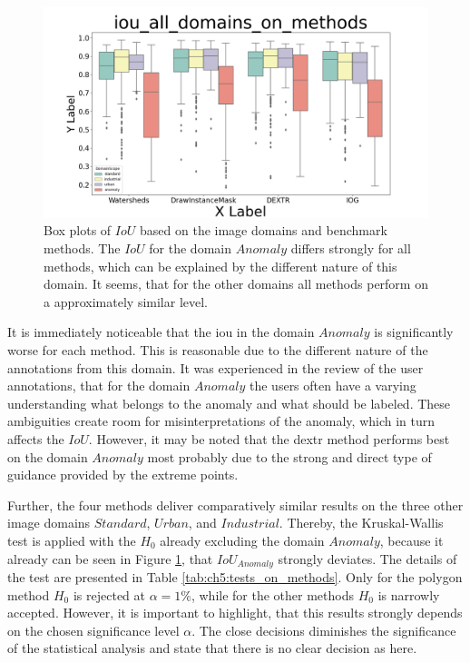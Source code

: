 \begin{figure}[h!]
	\centering
	\includegraphics[width=\textwidth]{figures/chap52_iou_mehtods_over_domains_boxplot.png}
	\caption [Box plots of image domains and methods on  $ IoU $]{
		Box plots of $ IoU $ based on the image domains and benchmark methods.
		The $ IoU $ for the domain $ Anomaly $ differs strongly for all methods, which can be explained by the different nature of this domain.
		It seems, that for the other domains all methods perform on a approximately similar level.
	}\label{fig:ch5:sec2:methods_over_domain_iou}
\end{figure}

It is immediately noticeable that the \gls{iou} in the domain $ Anomaly $ is significantly worse for each method.
This is reasonable due to the different nature of the annotations from this domain.
It was experienced in the review of the user annotations, that for the domain $ Anomaly $ the users often have a varying understanding what belongs to the anomaly and what should be labeled.
These ambiguities create room for misinterpretations of the anomaly, which in turn affects the $ IoU $.
However, it may be noted that the \gls{dextr} method performs best on the domain $ Anomaly $ most probably due to the strong and direct type of guidance provided by the extreme points.

Further, the four methods deliver comparatively similar results on the three other image domains $ Standard $, $ Urban $, and $ Industrial $.
Thereby, the Kruskal-Wallis test is applied with the $ H_{0} $ already excluding the domain $ Anomaly $, because it already can be seen in Figure \ref{fig:ch5:sec2:methods_over_domain_iou}, that $ IoU_{Anomaly} $ strongly deviates.
The details of the test are presented in Table \ref{tab:ch5:tests_on_methods}.
Only for the polygon method $ H_{0} $ is rejected at $ \alpha = 1\% $, while for the other methods $ H_{0} $ is narrowly accepted.
However, it is important to highlight, that this results strongly depends on the chosen significance level $ \alpha $.
The close decisions diminishes the significance of the statistical analysis and state that there is no clear decision as here.

